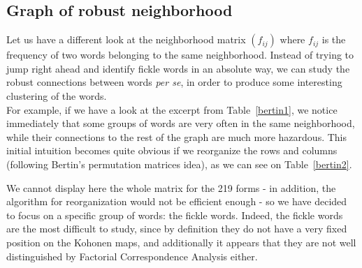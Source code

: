 \documentclass[preprint]{elsarticle}
\begin{document}
\subsection{Graph of robust neighborhood}

Let us have a different look at the neighborhood matrix $(f_{ij})$ where $f_{ij}$ is the frequency of two words  belonging to the same neighborhood. Instead of trying to jump right ahead and identify fickle words in an absolute way, we can study the robust connections between words \textit{per se}, in order to produce some interesting clustering of the words.\\

For example, if we have a look at the excerpt from Table~\ref{bertin1}, we notice immediately that some groups of words are very often in the same neighborhood, while their connections to the rest of the graph are much more hazardous. This initial intuition becomes quite obvious if we reorganize the rows and columns (following Bertin's permutation matrices idea), as we can see on Table~\ref{bertin2}.

We cannot display here the whole matrix for the 219 forms - in addition, the algorithm for reorganization would not be efficient enough - so we have decided to focus on a specific group of words: the fickle words. Indeed, the fickle words are the most difficult to study, since by definition they do not have a very fixed position on the Kohonen maps, and additionally it appears that they are not well distinguished by Factorial Correspondence Analysis either.
\end{document}
